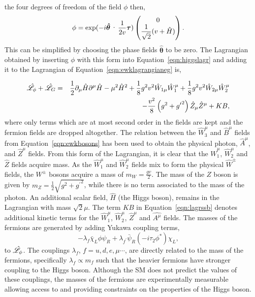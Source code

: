 the four degrees of freedom of the field $\phi$ then, 
\begin{equation}
\phi = \exp(-i\boldsymbol{\hat{\theta}}\cdot\frac{1}{2v}\boldsymbol{\tau}) 
\everymath{\displaystyle} \begin{pmatrix}
0 \\ 
\frac{1}{\sqrt{2}}(v+\hat{H})
\end{pmatrix}.
\end{equation}
This can be simplified by choosing the phase fields $\boldsymbol{\hat{\theta}}$ 
to be zero. The Lagrangian obtained by inserting $\phi$ with this form 
into Equation~\ref{eqn:higgslagr} and adding it to the Lagrangian of 
Equation~\ref{eqn:ewklagrangianeg} is,

\begin{eqnarray}
\hat{\mathscr{L}}_{\phi}+\hat{\mathscr{L}}_{G} 
	     & = &   \frac{1}{2} \partial_{\mu} \hat{H} \partial^{\mu} \hat{H} 
	     - \mu^{2} \hat{H}^{2} 
	     + \frac{1}{8} g^{2}v^{2}\hat{W}_{1\mu}\hat{W}_{1}^{\mu}
	     + \frac{1}{8} g^{2}v^{2}\hat{W}_{2\mu}\hat{W}_{2}^{\mu}	
\nonumber \\
	    & & - \frac{v^{2}}{8} \left(g^{2}+{g^{\prime}}^{2}\right)\hat{Z}_{\mu}\hat{Z}^{\mu}
	     + KB ,
\label{eqn:lagrssb}
\end{eqnarray}
where only terms which are at most second order in the fields are kept and the 
fermion fields are dropped altogether. 
The relation between the $\hat{W}^{\mu}_{3}$ 
and $\hat{B}^{\mu}$ fields from Equation~\ref{eqn:ewkbosons} has been used to obtain
the physical photon, $\hat{A}^{\mu}$, and $\hat{Z}^{\mu}$ 
fields. 
From this form of the Lagrangian, it is clear that the $\hat{W}_{1}^{\mu}$,  
$\hat{W}^{\mu}_{2}$ and $\hat{Z}$ fields acquire mass. As the $\hat{W}_{1}^{\mu}$ and 
$\hat{W}^{\mu}_{2}$ fields mix to form the physical $\hat{W}^{\pm}$ fields, 
the $W^{\pm}$ bosons acquire a mass of $m_{W} = \frac{\displaystyle gv}{\displaystyle 2}$.
The mass of the $Z$ boson is given by 
$m_{Z}=\frac{\displaystyle 1}{\displaystyle 2}\sqrt{g^{2}+{g^{\prime}}^{2}}$, 
while there is no term associated to the mass of the photon.
An additional scalar field, $\hat{H}$ (the Higgs boson), 
remains in the Lagrangian with mass $\sqrt{2}\mu$. 
The term $KB$ in Equation~\ref{eqn:lagrssb} denotes additional kinetic terms for the $\hat{W}^{\mu}_{1}$, 
$\hat{W}^{\mu}_{2}$, $\hat{Z}^{\mu}$ and $\hat{A^{\mu}}$ fields. 
The masses of the fermions are generated by adding Yukawa coupling
terms,
\begin{equation} 
-\lambda_{f} \bar{\chi}_{L} \phi \psi_{R} + \lambda_{f^{\prime}}\bar{\psi}_{R}(-i\tau_{2}\phi^{*})\chi_{L},
\end{equation}
to $\hat{\mathscr{L}}_{\phi}$. 
The couplings $\lambda_{f}$, $f=u,d,e,\mu\cdots$,  are directly related
to the mass of the fermions, specifically 
$\lambda_{f}\propto m_{f}$ such that the heavier fermions have stronger
coupling to the Higgs boson. Although the SM does not predict the values of these
couplings, the masses of the fermions are experimentally measurable allowing 
access to and providing constraints on the properties of the Higgs boson.

